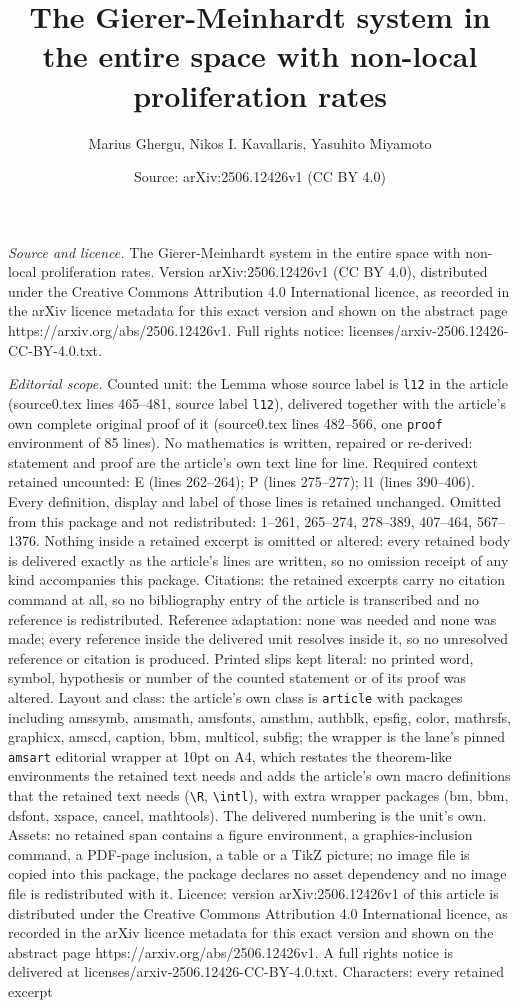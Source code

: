 \documentclass[10pt,a4paper]{amsart}
\title[The Gierer-Meinhardt system in the entire space with non-loc]{The Gierer-Meinhardt system in the entire space with non-local proliferation rates}
\author{Marius Ghergu, Nikos I. Kavallaris, Yasuhito Miyamoto}
\date{Source: arXiv:2506.12426v1 (CC BY 4.0)}
\begin{document}
\maketitle

\noindent\emph{Source and licence.} The Gierer-Meinhardt system in the entire space with non-local proliferation rates. Version arXiv:2506.12426v1 (CC BY 4.0), distributed under the Creative Commons Attribution 4.0 International licence, as recorded in the arXiv licence metadata for this exact version and shown on the abstract page https://arxiv.org/abs/2506.12426v1. Full rights notice: licenses/arxiv-2506.12426-CC-BY-4.0.txt.\par\smallskip

\noindent\textit{Editorial scope.} Counted unit: the Lemma whose source label is \texttt{l12} in the article (source0.tex lines 465--481, source label \texttt{l12}), delivered together with the article's own complete original proof of it (source0.tex lines 482--566, one \texttt{proof} environment of 85 lines). No mathematics is written, repaired or re-derived: statement and proof are the article's own text line for line. Required context retained uncounted: E (lines 262--264); P (lines 275--277); l1 (lines 390--406). Every definition, display and label of those lines is retained unchanged. Omitted from this package and not redistributed: 1--261, 265--274, 278--389, 407--464, 567--1376. Nothing inside a retained excerpt is omitted or altered: every retained body is delivered exactly as the article's lines are written, so no omission receipt of any kind accompanies this package. Citations: the retained excerpts carry no citation command at all, so no bibliography entry of the article is transcribed and no reference is redistributed. Reference adaptation: none was needed and none was made; every reference inside the delivered unit resolves inside it, so no unresolved reference or citation is produced. Printed slips kept literal: no printed word, symbol, hypothesis or number of the counted statement or of its proof was altered. Layout and class: the article's own class is \texttt{article} with packages including amssymb, amsmath, amsfonts, amsthm, authblk, epsfig, color, mathrsfs, graphicx, amscd, caption, bbm, multicol, subfig; the wrapper is the lane's pinned \texttt{amsart} editorial wrapper at 10pt on A4, which restates the theorem-like environments the retained text needs and adds the article's own macro definitions that the retained text needs (\texttt{\textbackslash R}, \texttt{\textbackslash intl}), with extra wrapper packages (bm, bbm, dsfont, xspace, cancel, mathtools). The delivered numbering is the unit's own. Assets: no retained span contains a figure environment, a graphics-inclusion command, a PDF-page inclusion, a table or a TikZ picture; no image file is copied into this package, the package declares no asset dependency and no image file is redistributed with it. Licence: version arXiv:2506.12426v1 of this article is distributed under the Creative Commons Attribution 4.0 International licence, as recorded in the arXiv licence metadata for this exact version and shown on the abstract page https://arxiv.org/abs/2506.12426v1. A full rights notice is delivered at licenses/arxiv-2506.12426-CC-BY-4.0.txt. Characters: every retained excerpt 
\end{document}
